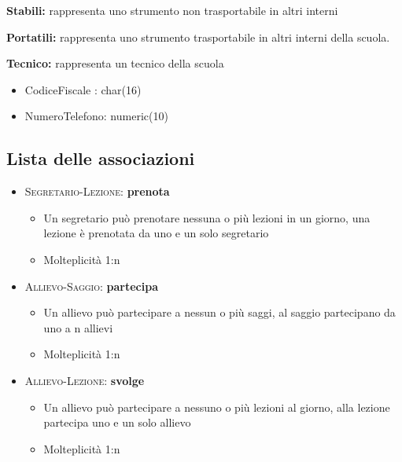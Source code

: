 \documentclass{article}
\begin{document}
\textbf{Stabili: }rappresenta uno strumento non trasportabile in altri interni \medskip

\textbf{Portatili: }rappresenta uno strumento trasportabile in altri interni della scuola.

\begin{flushleft}
\textbf{Tecnico: }rappresenta un tecnico della scuola
\end{flushleft}

\begin{itemize}
	\item CodiceFiscale : char(16)
	\item NumeroTelefono: numeric(10)
\end{itemize}

\bigskip


\subsection{Lista delle associazioni}\bigskip

\begin{itemize}
\item \textsc {Segretario-Lezione}: \textbf{prenota}
	\begin{itemize}
	\item Un segretario può prenotare nessuna o più lezioni in un giorno, una lezione è prenotata da uno e un solo segretario
	\item Molteplicità 1:n
	\end{itemize}
\end{itemize}

\smallskip

\begin{itemize}
\item \textsc {Allievo-Saggio}: \textbf{partecipa}
	\begin{itemize}
	\item Un allievo può partecipare a nessun o più saggi, al saggio partecipano da uno a n allievi
	\item Molteplicità 1:n
	\end{itemize}
\end{itemize}

\smallskip

\begin{itemize}
\item \textsc {Allievo-Lezione}: \textbf{svolge}
	\begin{itemize}
	\item Un allievo può partecipare a nessuno o più lezioni al giorno, alla lezione partecipa uno e un solo allievo
	\item Molteplicità 1:n
	\end{itemize}
\end{itemize}
\end{document}
